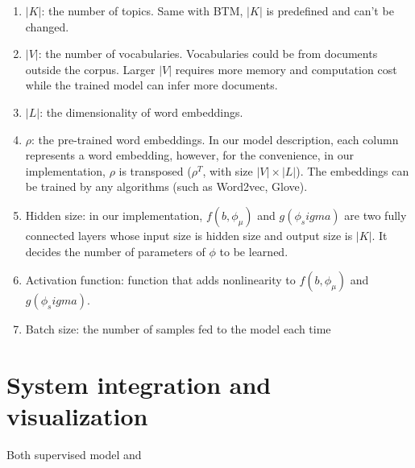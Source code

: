 \begin{enumerate}
    \item $|K|$: the number of topics. Same with BTM, $|K|$ is predefined and can't be changed.
    \item $|V|$: the number of vocabularies. Vocabularies could be from documents outside the corpus. Larger $|V|$ requires more memory and computation cost while the trained model can infer more documents.
    \item $|L|$: the dimensionality of word embeddings. 
    \item $\rho$: the pre-trained word embeddings. In our model description, each column represents a word embedding, however, for the convenience, in our implementation, $\rho$ is transposed ($\rho^T$, with size $|V|\times|L|$). The embeddings can be trained by any algorithms (such as Word2vec, Glove). 
    \item Hidden size: in our implementation, $f(b,\phi_\mu)$ and $g(\phi_sigma)$ are two fully connected layers whose input size is hidden size and output size is $|K|$. It decides the number of parameters of $\phi$ to be learned.
    \item Activation function: function that adds nonlinearity to $f(b,\phi_\mu)$ and $g(\phi_sigma)$.
    \item Batch size: the number of samples fed to the model each time
\end{enumerate}

\section{System integration and visualization}
Both supervised model and 